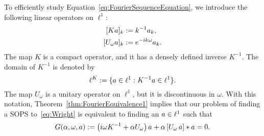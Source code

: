 To efficiently study Equation~\eqref{eq:FourierSequenceEquation}, we introduce the following linear operators on $ \ell^1$:
\begin{alignat*}{1}
   [K \c ]_k &:= k^{-1} \c_k  , \\ 
   [ U_\omega \c ]_k &:= e^{-i k \omega} \c_k  .
\end{alignat*}
The map $K$ is a compact operator, and it has a densely defined inverse $K^{-1}$. The domain of $K^{-1}$ is denoted by
\[
  \ell^K := \{ a \in \ell^1 : K^{-1} a \in \ell^1 \}.  
\]
The map $U_{\omega}$ is a unitary operator on $\ell^1$, but
it is discontinuous in $\omega$. 
With this notation, Theorem~\ref{thm:FourierEquivalence1} implies that our problem of finding a SOPS to~\eqref{eq:Wright} is equivalent to finding an $a \in \ell^1$ such that
\begin{equation}
\label{e:defG}
  G(\alpha,\omega,a) :=
  \left( i \omega K^{-1} + \alpha U_\omega \right) a + \alpha \left[U_\omega \, a \right] * a  = 0.
\end{equation}




